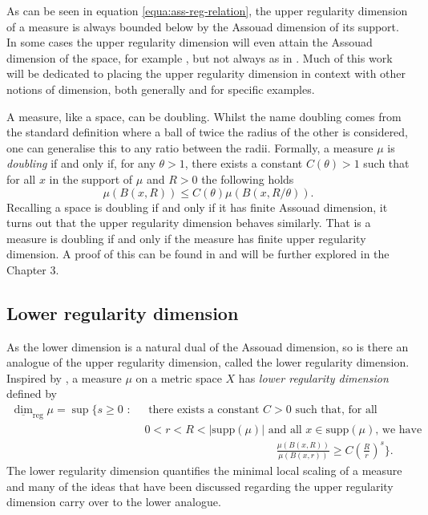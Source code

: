 As can be seen in equation \eqref{equa:ass-reg-relation}, the upper regularity dimension of a measure is always bounded below by the Assouad dimension of its support. In some cases the upper regularity dimension will even attain the Assouad dimension of the space, for example \cite[Theorem 2.3]{fraser-howroyd1}, but not always as in \cite{anti2}. Much of this work will be dedicated to placing the upper regularity dimension in context with other notions of dimension, both generally and for specific examples.

A measure, like a space, can be doubling. Whilst the name doubling comes from the standard definition where a ball of twice the radius of the other is considered, one can generalise this to any ratio between the radii. Formally, a measure $\mu$ is \textit{doubling} if and only if, for any $\theta > 1$, there exists a constant $C(\theta) > 1$ such that for all $x$ in the support of $\mu$ and $R > 0$ the following holds
\[
\mu(B(x,R)) \le C(\theta) \mu(B(x,R/\theta)).
\]
Recalling a space is doubling if and only if it has finite Assouad dimension, it turns out that the upper regularity dimension behaves similarly. That is a measure is doubling if and only if the measure has finite upper regularity dimension. A proof of this can be found in \cite[Lemma 3.2]{kaenmakinew} and will be further explored in the Chapter 3. 


\subsection{Lower regularity dimension}
\label{sec:intro-lower-reg}


As the lower dimension is a natural dual of the Assouad dimension, so is there an analogue of the upper regularity dimension, called the lower regularity dimension. Inspired by \cite{bylund}, a measure $\mu$ on a metric space $X$ has \textit{lower regularity dimension} defined by 
\begin{align*} 
\underline{\dim}_{\text{reg}} \mu = \sup \Bigg\{ s \geq 0 \, \,  : \,  &\,\text{ there exists a  constant }C  > 0\text{  such that, for all }  \\ & \, 0< r< R < \lvert \text{supp}(\mu)    \rvert \text{  and all $x \in \text{supp} (\mu)$, we have }  \\  & \hspace{5cm} \frac{\mu(B(x,R))}{\mu(B(x,r))} \geq C\left(\frac{R}{r}\right)^{s} \Bigg\}.
\end{align*}
The lower regularity dimension quantifies the minimal local scaling of a measure and many of the ideas that have been discussed regarding the upper regularity dimension carry over to the lower analogue. 

